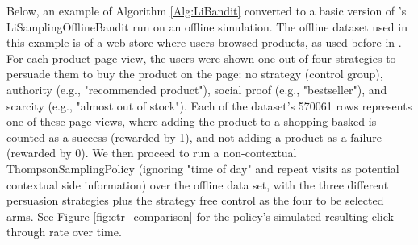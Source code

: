 \documentclass{jss}\usepackage[]{graphicx}\usepackage[]{color}
\begin{document}
Below, an example of Algorithm \ref{Alg:LiBandit} converted to a basic version of 's  LiSamplingOfflineBandit run on an offline simulation. The offline dataset used in this example is of a web store where users browsed products, as used before in \cite{Kaptein2018}. For each product page view, the users were shown one out of four strategies to persuade them to buy the product on the page: no strategy (control group), authority (e.g., "recommended product"), social proof (e.g., "bestseller"), and scarcity (e.g., "almost out of stock"). Each of the dataset's 570061 rows represents one of these page views, where adding the product to a shopping basked is counted as a success (rewarded by 1), and not adding a product as a failure (rewarded by 0). We then proceed to run a non-contextual ThompsonSamplingPolicy (ignoring "time of day" and repeat visits as potential contextual side information) over the offline data set, with the three different persuasion strategies plus the strategy free control as the four to be selected arms. See Figure \ref{fig:ctr_comparison} for the policy's simulated resulting click-through rate over time.
\end{document}
